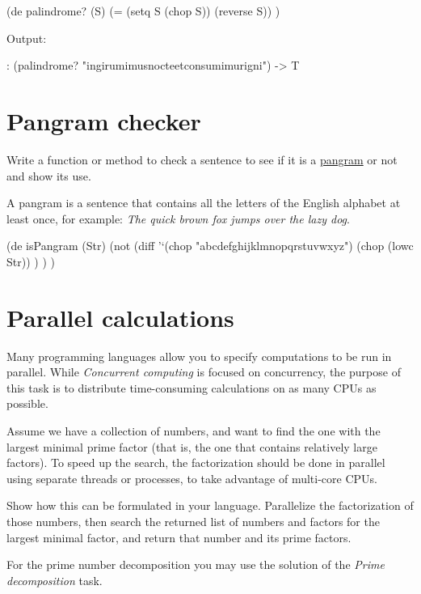 \begin{wideverbatim}

(de palindrome? (S)
   (= (setq S (chop S)) (reverse S)) )

Output:

: (palindrome? "ingirumimusnocteetconsumimurigni")
-> T

\end{wideverbatim}

\pagebreak{}
\section*{Pangram checker}

Write a function or method to check a sentence to see if it is a
\href{http://en.wikipedia.org/wiki/Pangram}{pangram} or not and show its
use.

A pangram is a sentence that contains all the letters of the English
alphabet at least once, for example: \emph{The quick brown fox jumps
over the lazy dog}.

\begin{wideverbatim}

(de isPangram (Str)
   (not
      (diff
         '`(chop "abcdefghijklmnopqrstuvwxyz")
         (chop (lowc Str)) ) ) )

\end{wideverbatim}

\pagebreak{}
\section*{Parallel calculations}

Many programming languages allow you to specify computations to be run
in parallel. While \emph{Concurrent
computing} is focused on concurrency, the purpose of this task is to
distribute time-consuming calculations on as many CPUs as possible.

Assume we have a collection of numbers, and want to find the one with
the largest minimal prime factor (that is, the one that contains
relatively large factors). To speed up the search, the factorization
should be done in parallel using separate threads or processes, to take
advantage of multi-core CPUs.

Show how this can be formulated in your language. Parallelize the
factorization of those numbers, then search the returned list of numbers
and factors for the largest minimal factor, and return that number and
its prime factors.

For the prime number decomposition you may use the solution of the
\emph{Prime decomposition} task.


